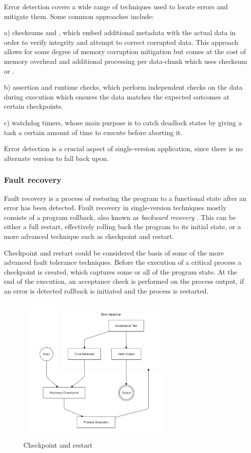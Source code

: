 Error detection covers a wide range of techniques used to locate errors and mitigate them. Some common approaches include:

a) checksums and , which embed additional metadata with the actual data in order to verify integrity and attempt to correct corrupted data. This approach allows for some degree of memory corruption mitigation but comes at the cost of memory overhead and additional processing per data-chunk which uses checksum or .

b) assertion and runtime checks, which perform independent checks on the data during execution which ensures the data matches the expected outcomes at certain checkpoints.

c) watchdog timers, whose main purpose is to catch deadlock states by giving a task a certain amount of time to execute before aborting it.

Error detection is a crucial aspect of single-version application, since there is no alternate version to fall back upon.

\subsubsection{Fault recovery}

Fault recovery is a process of restoring the program to a functional state after an error has been detected. Fault recovery in single-version techniques mostly consists of a program rollback, also known as \textit{backward recovery} \cite{shubu}. This can be either a full restart, effectively rolling back the program to its initial state, or a more advanced technique such as checkpoint and restart\cite{nasa:sft}.

Checkpoint and restart could be considered the basis of some of the more advanced fault tolerance techniques. Before the execution of a critical process a checkpoint is created, which captures some or all of the program state. At the end of the execution, an acceptance check is performed on the process output, if an error is detected rollback is initiated and the process is restarted.

\begin{figure}[hbt]
    \centering
    \includegraphics[width=0.7\textwidth]{diagrams/checkpoint/checkpoint.png}
    \caption{Checkpoint and restart}
    \label{fig:checkpoint}
\end{figure}


